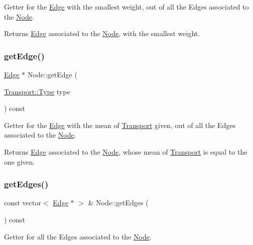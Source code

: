 Getter for the \hyperlink{class_edge}{Edge} with the smallest weight, out of all the Edges associated to the \hyperlink{class_node}{Node}.

\begin{DoxyReturn}{Returns}
\hyperlink{class_edge}{Edge} associated to the \hyperlink{class_node}{Node}, with the smallest weight. 
\end{DoxyReturn}
\hypertarget{class_node_aaf31a7f0f8e4dea82e48b1b09b89c217}{}\label{class_node_aaf31a7f0f8e4dea82e48b1b09b89c217} 
\subsubsection{\texorpdfstring{get\+Edge()}{getEdge()}\hspace{0.1cm}{\footnotesize\ttfamily [2/2]}}
{\footnotesize\ttfamily \hyperlink{class_edge}{Edge} $\ast$ Node\+::get\+Edge (\begin{DoxyParamCaption}\item[{\hyperlink{class_transport_a1879cecfed0d4238e5a7af6d085db317}{Transport\+::\+Type}}]{type }\end{DoxyParamCaption}) const}

Getter for the \hyperlink{class_edge}{Edge} with the mean of \hyperlink{class_transport}{Transport} given, out of all the Edges associated to the \hyperlink{class_node}{Node}.

\begin{DoxyReturn}{Returns}
\hyperlink{class_edge}{Edge} associated to the \hyperlink{class_node}{Node}, whose mean of \hyperlink{class_transport}{Transport} is equal to the one given. 
\end{DoxyReturn}
\hypertarget{class_node_a10a4e5c428f496080172680cb20ea9e0}{}\label{class_node_a10a4e5c428f496080172680cb20ea9e0} 
\subsubsection{\texorpdfstring{get\+Edges()}{getEdges()}}
{\footnotesize\ttfamily const vector$<$ \hyperlink{class_edge}{Edge} $\ast$ $>$ \& Node\+::get\+Edges (\begin{DoxyParamCaption}{ }\end{DoxyParamCaption}) const}

Getter for all the Edges associated to the \hyperlink{class_node}{Node}.

